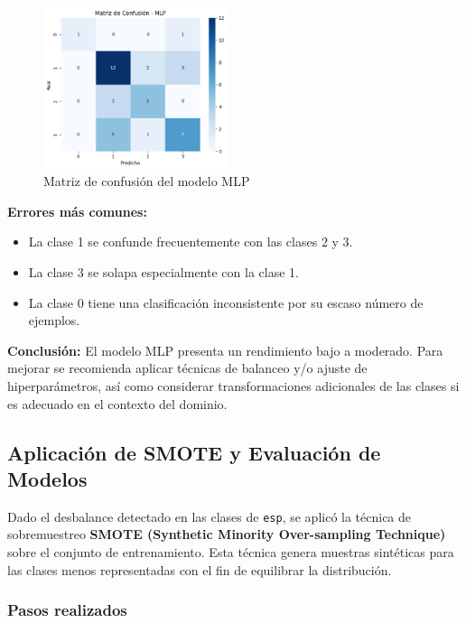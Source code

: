 \documentclass[11pt,a4paper]{article}
\begin{document}
\begin{figure}[H]
\centering
\includegraphics[width=0.48\textwidth]{img/matriz_confusion_mlp.png}
\caption{Matriz de confusión del modelo MLP}
\end{figure}

\textbf{Errores más comunes:}
\begin{itemize}
    \item La clase 1 se confunde frecuentemente con las clases 2 y 3.
    \item La clase 3 se solapa especialmente con la clase 1.
    \item La clase 0 tiene una clasificación inconsistente por su escaso número de ejemplos.
\end{itemize}

\textbf{Conclusión:} El modelo MLP presenta un rendimiento bajo a moderado. Para mejorar se recomienda aplicar técnicas de balanceo y/o ajuste de hiperparámetros, así como considerar transformaciones adicionales de las clases si es adecuado en el contexto del dominio.

\subsection{Aplicación de SMOTE y Evaluación de Modelos}

Dado el desbalance detectado en las clases de \texttt{esp}, se aplicó la técnica de sobremuestreo \textbf{SMOTE (Synthetic Minority Over-sampling Technique)} sobre el conjunto de entrenamiento. Esta técnica genera muestras sintéticas para las clases menos representadas con el fin de equilibrar la distribución.

\subsubsection*{Pasos realizados}
\end{document}
